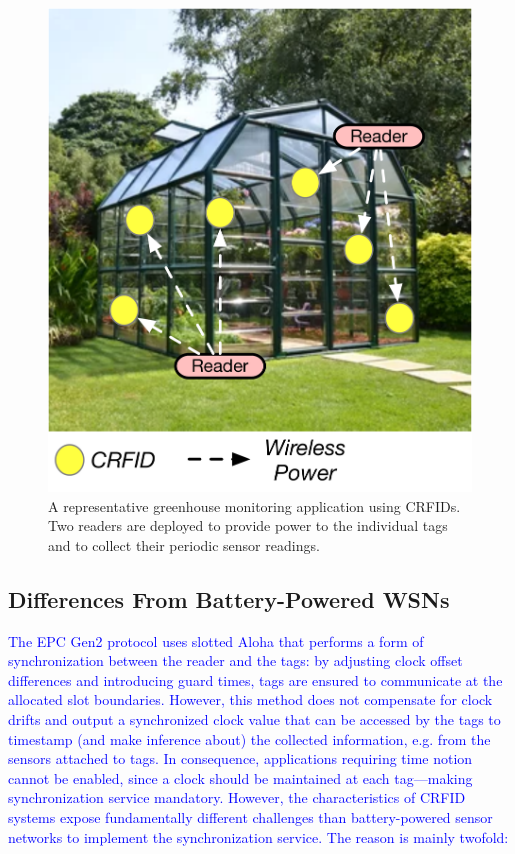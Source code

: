 \documentclass[10pt,journal,compsoc]{IEEEtran}
\newcommand{\add}[1]{\textcolor{blue}{#1}}
\begin{document}
\begin{figure}
	\centering
	\includegraphics[width=0.5\columnwidth]{figures/scenario.pdf}
	\caption{\label{fig:motivation}\color{blue}A representative greenhouse monitoring application using CRFIDs. Two readers are deployed to provide power to the individual tags and to collect their periodic sensor readings.}
\end{figure}

\subsection{Differences From Battery-Powered WSNs }
\label{sec:Motivation}

\add{The EPC Gen2 protocol uses slotted Aloha that performs a form of synchronization between the reader and the tags: by adjusting clock offset differences and introducing guard times, tags are ensured to communicate at the allocated slot boundaries. However, this method does not compensate for clock drifts and output a synchronized clock value that can be accessed by the tags to timestamp (and make inference about) the collected information, e.g. from the sensors attached to tags. In consequence, applications requiring time notion cannot be enabled, since a clock should be maintained at each tag---making synchronization service mandatory. However, the characteristics of CRFID systems expose fundamentally different challenges than battery-powered sensor networks to implement the synchronization service. The reason is mainly twofold:}
\end{document}
